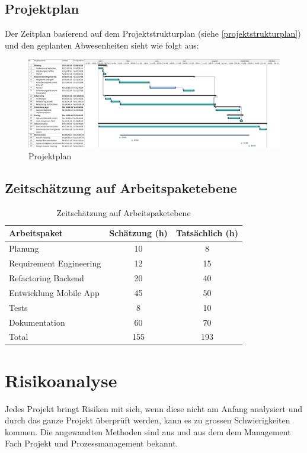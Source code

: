 \begin{landscape}
\thispagestyle{empty}
\subsection{Projektplan}\label{projektplan}
Der Zeitplan basierend auf dem Projektstrukturplan (siehe \ref{projektstrukturplan})  und den geplanten Abwesenheiten sieht wie folgt aus:
\begin{figure}[h]
\centering
\includegraphics[scale=0.5]{images/project/projectplan.png}
\caption{Projektplan}
\label{fig:psp}
\end{figure}

\end{landscape}

\subsection{Zeitschätzung auf Arbeitspaketebene}
\begin{table}[ht]
\centering
  \begin{tabular}{ l | c | c }
	\hline
	\rowcolor{gray}
	Arbeitspaket							&	Schätzung (h)	& Tatsächlich (h)	\\ \hline
	Planung							&	10			& 8	\\ \hline
	Requirement Engineering					&	12			& 15	\\ \hline
	Refactoring Backend					&	20			& 40	\\ \hline
	Entwicklung Mobile App					&	45			& 50	\\ \hline
	Tests								&	8			& 10	\\ \hline
	Dokumentation						&	60			& 70	\\ \hline \hline
	Total								&	155			& 193	\\ \hline
  \end{tabular}
   \caption{Zeitschätzung auf Arbeitspaketebene}\label{table:time_estimation}
\end{table}

\section{Risikoanalyse}\label{risikoanalyse}
Jedes Projekt bringt Risiken mit sich, wenn diese nicht am Anfang analysiert und durch das ganze Projekt überprüft werden, kann es zu grossen Schwierigkeiten kommen. Die angewandten Methoden sind aus \cite{proj_mgmt_book} und aus dem dem Management Fach Projekt und Prozessmanagement bekannt.

